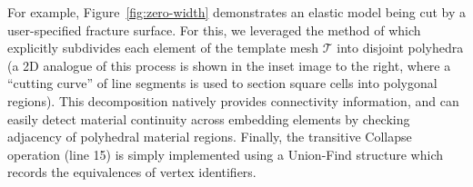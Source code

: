 
For example, Figure~\ref{fig:zero-width} demonstrates an elastic model
being cut by a user-specified fracture surface. For this, we leveraged
the method of \citet{SifakDF:2007} which explicitly
subdivides each element of the template mesh $\mathcal{T}$ into
disjoint polyhedra (a 2D analogue of this process is shown in the
inset image to the right, where a ``cutting curve'' of line segments
is used to section square cells into polygonal regions). This
decomposition natively provides connectivity information, and can
easily detect material continuity across embedding elements by
checking adjacency of polyhedral material regions.  Finally, the
transitive \textsf{Collapse} operation (line 15) is simply implemented
using a \textsf{Union-Find} structure which records the equivalences
of vertex identifiers.



